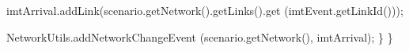 \documentclass[fancy, oneside, mastersfancy, ms]{byuthesis}
\newenvironment{Shaded}{\begin{snugshade}}{\end{snugshade}}
\newcommand{\FunctionTok}[1]{\textcolor[rgb]{0.28,0.35,0.67}{#1}}
\newcommand{\NormalTok}[1]{\textcolor[rgb]{0.00,0.23,0.31}{#1}}
\newcommand{\OperatorTok}[1]{\textcolor[rgb]{0.37,0.37,0.37}{#1}}
\begin{document}
\begin{Shaded}
\begin{Highlighting}[]
\NormalTok{        imtArrival}\OperatorTok{.}\FunctionTok{addLink}\OperatorTok{(}\NormalTok{scenario}\OperatorTok{.}\FunctionTok{getNetwork}\OperatorTok{().}\FunctionTok{getLinks}\OperatorTok{().}\FunctionTok{get}
          \OperatorTok{(}\NormalTok{imtEvent}\OperatorTok{.}\FunctionTok{getLinkId}\OperatorTok{()));}
          
\NormalTok{        NetworkUtils}\OperatorTok{.}\FunctionTok{addNetworkChangeEvent}
          \OperatorTok{(}\NormalTok{scenario}\OperatorTok{.}\FunctionTok{getNetwork}\OperatorTok{(),}\NormalTok{ imtArrival}\OperatorTok{);}
    \OperatorTok{\}}
\OperatorTok{\}}
\end{Highlighting}
\end{Shaded}
\end{document}
